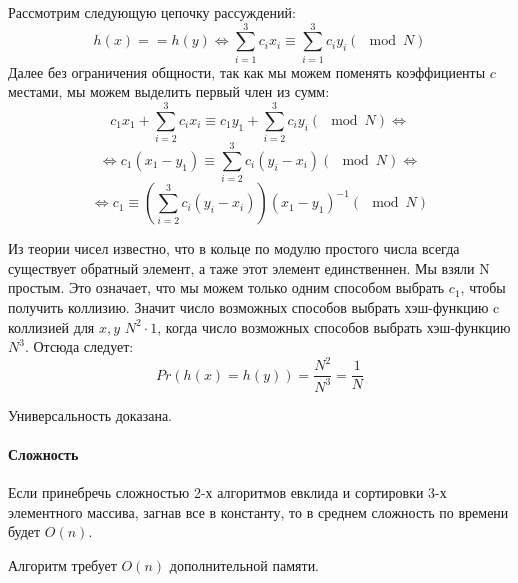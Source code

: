 \documentclass[12pt]{article}
\begin{document}
Рассмотрим следующую цепочку рассуждений:
$$
h(x) == h(y) \Leftrightarrow \sum\limits_{i = 1}^3 c_i x_i
\equiv \sum\limits_{i = 1}^3 c_i y_i (\mod N)
$$
Далее без ограничения общности, так как мы можем поменять
коэффициенты $ c $ местами, мы можем выделить первый член из сумм:
$$
c_1 x_1 + \sum\limits_{i = 2}^3 c_i x_i \equiv
c_1 y_1 + \sum\limits_{i = 2}^3 c_i y_i (\mod N)
\Leftrightarrow
$$
$$
\Leftrightarrow
c_1(x_1 - y_1) \equiv \sum\limits_{i = 2}^3 c_i (y_i - x_i) (\mod N)
\Leftrightarrow
$$
$$
\Leftrightarrow
c_1 \equiv \left(\sum\limits_{i = 2}^3 c_i (y_i - x_i)\right)
(x_1 - y_1)^{-1} (\mod N)
$$

Из теории чисел известно, что в кольце по модулю простого числа всегда
существует обратный элемент, а таже этот элемент единственнен. Мы взяли
N простым. Это означает, что мы можем только одним способом выбрать $ c_1 $,
чтобы получить коллизию. Значит число возможных способов выбрать хэш-функцию
c коллизией для $ x, y $ $ N^2 \cdot 1 $, когда число возможных способов
выбрать хэш-функцию $ N^3 $. Отсюда следует:
$$
Pr(h(x) = h(y)) = \frac{N^2}{N^3} = \frac{1}{N}
$$

Универсальность доказана.



\paragraph{Сложность}
Если принебречь сложностью 2-х алгоритмов евклида и сортировки 3-х
элементного массива, загнав все в константу, то в среднем сложность
по времени будет $ O(n) $.

Алгоритм требует $ O(n) $ дополнительной памяти.
\end{document}
